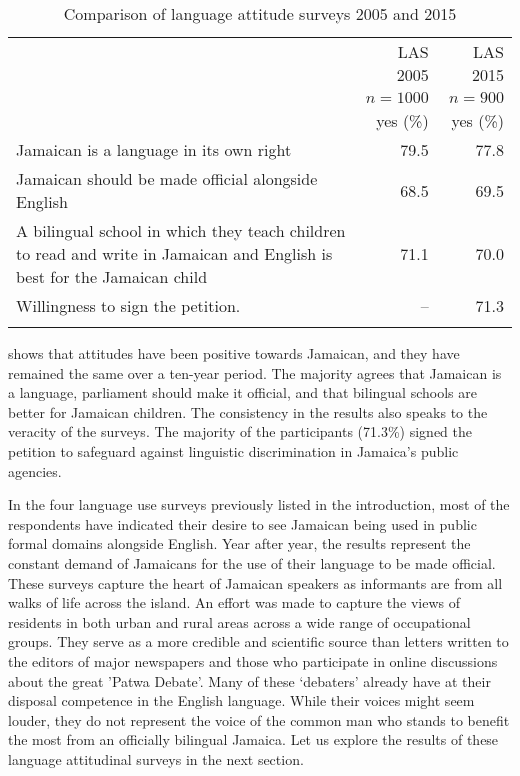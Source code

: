 \documentclass[output=paper,colorlinks,citecolor=brown]{langscibook}
\begin{document}
\begin{table}
\begin{tabularx}{\textwidth}{Qrr}
    \lsptoprule
    
                            & LAS 2005   & LAS 2015\\
                            & $n = 1000$ & $n=900$\\
                            & yes (\%) & yes (\%)\\\midrule
    Jamaican is a language in its own right & 79.5 & 77.8\\
    \tablevspace
    Jamaican should be made official alongside English & 68.5 & 69.5\\
    \tablevspace
    A bilingual school in which they teach children to read and write in Jamaican and English is best for the Jamaican child & 71.1 & 70.0\\
    \tablevspace
    Willingness to sign the petition. & -- & 71.3\\
    \lspbottomrule
\end{tabularx}
\caption{Comparison of language attitude surveys 2005 and 2015\label{tab:02:1}}
\end{table}

\begin{sloppypar}
 shows that attitudes have been positive towards Jamaican, and they have remained the same over a ten-year period. The majority agrees that Jamaican is a language, parliament should make it official, and that bilingual schools are better for Jamaican children. The consistency in the results also speaks to the veracity of the surveys. The majority of the participants (71.3\%) signed the petition to safeguard against linguistic discrimination in Jamaica’s public agencies.
\end{sloppypar}

In the four language use surveys previously listed in the introduction, most of the respondents have indicated their desire to see Jamaican being used in public formal domains alongside English. Year after year, the results represent the constant demand of Jamaicans for the use of their language to be made official. These surveys capture the heart of Jamaican speakers as informants are from all walks of life across the island. An effort was made to capture the views of residents in both urban and rural areas across a wide range of occupational groups. They serve as a more credible and scientific source than letters written to the editors of major newspapers and those who participate in online discussions about the great 'Patwa Debate'. Many of these ‘debaters’ already have at their disposal competence in the English language. While their voices might seem louder, they do not represent the voice of the common man who stands to benefit the most from an officially bilingual Jamaica. Let us explore the results of these language attitudinal surveys in the next section.
\end{document}
